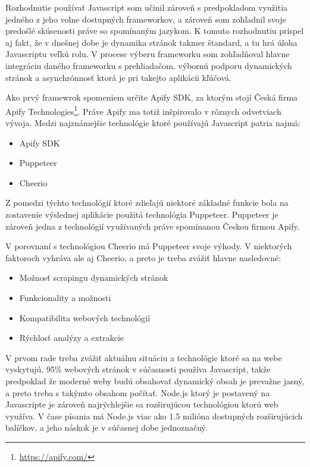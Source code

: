 \bigskip

Rozhodnutie používať Javascript som učinil zároveň s predpokladom využitia jedného z jeho volne dostupných frameworkov, a zároveň som zohľadnil svoje predošlé skúsenosti práve so spomínaným jazykom. K tomuto rozhodnutiu prispel aj fakt, že v dnešnej dobe je dynamika stránok takmer štandard, a tu hrá úloha Javascriptu veľkú rolu. V procese výberu frameworku som zohľadňoval hlavne integráciu daného frameworku s prehliadačom, výbornú podporu dynamických stránok a asynchrónnosť ktorá je pri takejto aplikácii kľúčová.

Ako prvý framewrok spomeniem určite Apify SDK, za ktorým stojí Česká firma Apify Technologies\footnote{{\url{https://apify.com/}}}.\cite{JanCurna:online} Práve Apify ma totiž inšpirovalo v rôznych odvetviach vývoja. Medzi najznámejšie technológie ktoré používajú Javascript patria najmä:

\begin{itemize}
    \item {Apify SDK}
    \item {Puppeteer}
    \item {Cheerio}
\end{itemize}

Z pomedzi týchto technológií ktoré zdieľajú niektoré základné funkcie bola na zostavenie výslednej aplikácie použitá technológia Puppeteer. Puppeteer je zároveň jedna z technológií využívaných práve spomínanou Českou firmou Apify. 

V porovnaní s technológiou Cheerio má Puppeteer svoje výhody. V niektorých faktoroch vyhráva ale aj Cheerio, a preto je treba zvážiť hlavne nasledovné:

\begin{itemize}
    \item {Možnosť scrapingu dynamických stránok}
    \item {Funkcionality a možnosti}
    \item {Kompatibilita webových technológií}
    \item {Rýchlosť analýzy a extrakcie}
\end{itemize}

V prvom rade treba zvážiť aktuálnu situáciu a technológie ktoré sa na webe vyskytujú. 95\% webových stránok v súčasnosti používa Javascript, takže predpoklad že moderné weby budú obsahovať dynamický obsah je prevažne jasný, a preto treba s takýmto obsahom počítať. Node.js ktorý je postavený na Javascripte je zároveň najrýchlejšie sa rozširujúcou technológiou ktorú web využíva. V čase písania má Node.js viac ako 1.5 milióna dostupných rozširujúcich balíčkov, a jeho náskok je v súčasnej dobe jednoznačný.\cite{HowPopular} 

